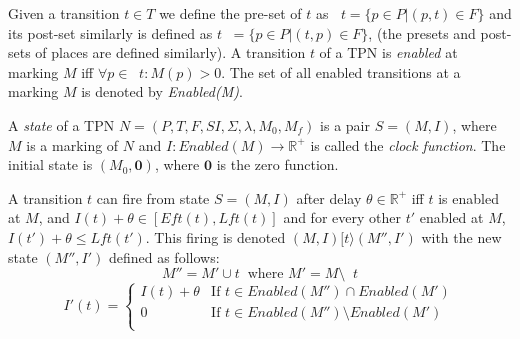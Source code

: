 \documentclass[conference]{IEEEtran}
\newcounter{cases}
\DeclareMathOperator*{\pre}{^\bullet}
\begin{document}
Given a transition $t \in T$ we define the pre-set of $t$ as $\pre t = \{p \in P | (p, t) \in F\}$ and its post-set similarly is defined as $t \pre = \{p \in P | (t, p) \in F\}$, (the presets and post-sets of places are defined similarly). A transition $t$ of a TPN is \textit{enabled} at marking $M$ iff $\forall p \in \pre t :  M(p) > 0$. 
The set of all enabled transitions at a marking $M$ is denoted by \textit{Enabled(M)}. 

A \textit{state} of a TPN $N = (P, T, F, SI, \Sigma, \lambda, M_0, M_f)$ is a pair $S = (M, I)$, where $M$ is a marking of $N$ and $I : Enabled(M) \rightarrow \mathbb{R^+}$ is called the \textit{clock function}. The initial state is $(M_0, \mathbf{0})$, where $\mathbf{0} $ is the zero function. 

A transition $t$ can fire from state $S = (M, I)$ after delay $\theta \in \mathbb{R}^+$
iff $t$ is enabled at $M$, and $I(t) + \theta \in [Eft(t), Lft(t)]$ and for
every other \(t'\) enabled at \(M\), $I(t') + \theta \leq Lft(t')$.
This firing is denoted $(M, I)[t\rangle(M'', I')$ with the new state $(M'', I')$ defined as follows:
$$M'' = M' \cup t \pre \textrm{
	where } M' = M \setminus \pre t $$ $$I'(t) =
\begin{cases}
	I(t) + \theta & \textrm{If } t \in Enabled(M'') \cap Enabled(M')\\
	0 & \textrm{If } t \in Enabled(M'') \setminus Enabled(M')\\
\end{cases}$$
\end{document}
